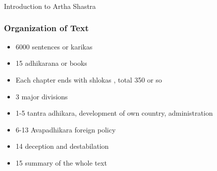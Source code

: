 \begin{frame}[fragile]\frametitle{}
\begin{center}
{\Large Introduction to Artha Shastra}
\end{center}
\end{frame}

\begin{frame}[fragile]\frametitle{Organization of Text}
	\begin{itemize}
	\item 6000 sentences or karikas
	\item 15 adhikarana or books
	\item Each chapter ends with shlokas , total 350 or so
	\item 3 major divisions
	\item 1-5 tantra adhikara, development of own country, administration 
	\item 6-13 Avapadhikara foreign policy 
	\item 14 deception and destabilation 
	\item 15 summary of the whole text
	\end{itemize}

\end{frame}
